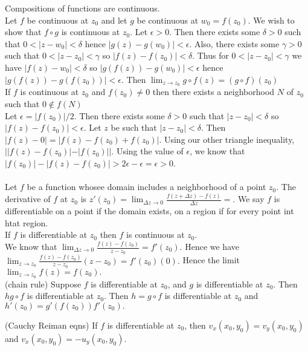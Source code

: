 \documentclass{article}
\begin{document}
 Compositions of functions are continuous. \\
 Let $f$ be continuous at $z_0$ and let $g$ be continuous at $w_0 = f(z_0)$. We wish to show that $f\circ g$ is continuous at $z_0$. Let $\epsilon > 0$. Then there exists some $\delta > 0$ such that $0<|z-w_0| < \delta$ hence $|g(z)- g(w_0)| <  \epsilon$. Also, there exists some $\gamma > 0$ such that $0< |z-z_0| < \gamma$ so $|f(z) - f(z_0)| < \delta$. Thus for $0 < |z - z_0|< \gamma$ we have $|f(z)-w_0| < \delta$ so $|g(f(z)) - g(w_0)| < \epsilon$ hence $|g(f(z)) - g(f(z_0))|  < \epsilon$. Then $\lim_{z\to z_0}g\circ f(z) = (g\circ f)(z_0)$\\

 If $f$ is continuous at $z_0$ and $f(z_0)\ne 0$ then there exists a neighborhood $N$ of $z_0$ such that $0\not \in f(N)$\\
 Let $\epsilon  = |f(z_0)|/2$. Then there exists some $\delta>0$ such that $|z-z_0| < \delta$ so $|f(z) - f(z_0)| < \epsilon$. Let $z$ be such that $|z-z_0|< \delta$. Then $|f(z) - 0| = |f(z)-f(z_0)+ f(z_0)|$. Using our other triangle inequality,  $||f(z)-f(z_0)| -  |f(z_0)||$. Using the value of $\epsilon$, we know that $|f(z_0)| - |f(z)-f(z_0)| > 2\epsilon - \epsilon = \epsilon > 0$.\\

\\
 Let $f$ be a function whosee domain includes a neighborhood of a point $z_0$. The derivative of $f$ at $z_0$ is $z'(z_0) = \lim_{\Delta z \to 0} \frac{f(z + \Delta z) - f(z)}{\Delta z} = .$ We say $f$ is differentiable on a point if the domain exists, on a region if for every point int htat region.\\

 If $f$ is differentiable at $z_0$ then $f$ is continuous at $z_0$.\\
 We know that $\lim_{\Delta z \to 0}\frac{f(z) - f(z_0)}{z-z_0} = f'(z_0).$ Hence we have $\lim_{z\to z_0}\frac{f(z) - f(z_0)}{z-z_0}(z-z_0) = f'(z_0)(0).$ Hence the limit $\lim_{z\to z_0}f(z) = f(z_0).$\\

 (chain rule) Suppose $f$ is differentiable at $z_0$, and $g$ is differentiable at $z_0$. Then $h g\circ f$ is differentiable at $z_0$. Then $h = g \circ f$ is differentiable at $z_0$ and $h'(z_0) = g'(f(z_0))f'(z_0).$

 (Cauchy Reiman eqns) If $f$ is differentiable at $z_0$, then $v_x(x_0,y_0) = v_y(x_0,y_0)$ and $v_x(x_0,y_0) = -u_y(x_0,y_0).$\\
\end{document}
